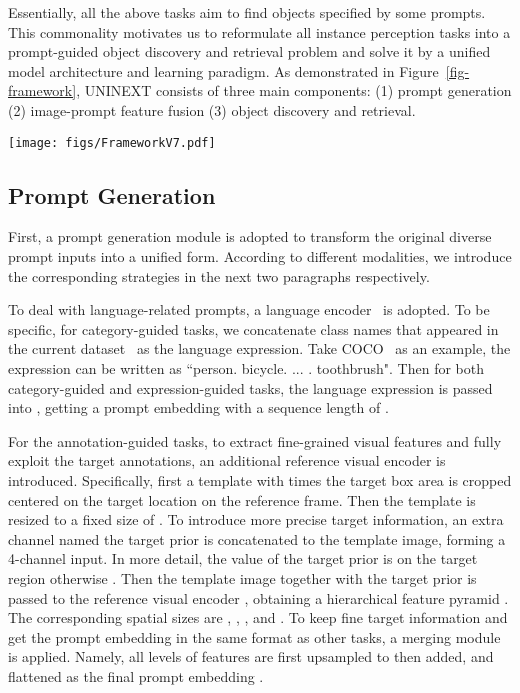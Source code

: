 \documentclass[10pt,twocolumn,letterpaper]{article}
\begin{document}
Essentially, all the above tasks aim to find objects specified by some prompts. This commonality motivates us to reformulate all instance perception tasks into a prompt-guided object discovery and retrieval problem and solve it by a unified model architecture and learning paradigm. As demonstrated in Figure~\ref{fig-framework}, UNINEXT consists of three main components: (1) prompt generation (2) image-prompt feature fusion (3) object discovery and retrieval. 

\begin{figure*}[!t]
  \begin{center}
\texttt{[image: figs/FrameworkV7.pdf]}
  \end{center}
  \vspace{-5mm}
\caption{Framework of UNINEXT. The whole pipeline is shown on the left side. The schematic diagram of object retrieval is shown on the right side. The instance head predicts both boxes and masks of the objects. Better view in color on screen.} \label{fig-framework}
\vspace{-3mm}
\end{figure*}

\subsection{Prompt Generation}
First, a prompt generation module is adopted to transform the original diverse prompt inputs into a unified form. According to different modalities, we introduce the corresponding strategies in the next two paragraphs respectively. 

To deal with language-related prompts, a language encoder~\cite{BERT}  is adopted. To be specific, for category-guided tasks, we concatenate class names that appeared in the current dataset~\cite{COCO,VIS,OVIS,BDD100K} as the language expression. Take COCO~\cite{COCO} as an example, the expression can be written as ``person. bicycle. ... . toothbrush". Then for both category-guided and expression-guided tasks, the language expression is passed into , getting a prompt embedding  with a sequence length of . 

For the annotation-guided tasks, to extract fine-grained visual features and fully exploit the target annotations, an additional reference visual encoder  is introduced. Specifically, first a template with  times the target box area is cropped centered on the target location on the reference frame. Then the template is resized to a fixed size of . To introduce more precise target information, an extra channel named the target prior is concatenated to the template image, forming a 4-channel input. In more detail, the value of the target prior is  on the target region otherwise . Then the template image together with the target prior is passed to the reference visual encoder , obtaining a hierarchical feature pyramid . The corresponding spatial sizes are , , , and . To keep fine target information and get the prompt embedding in the same format as other tasks, a merging module is applied. Namely, all levels of features are first upsampled to  then added, and flattened as the final prompt embedding .
\end{document}
